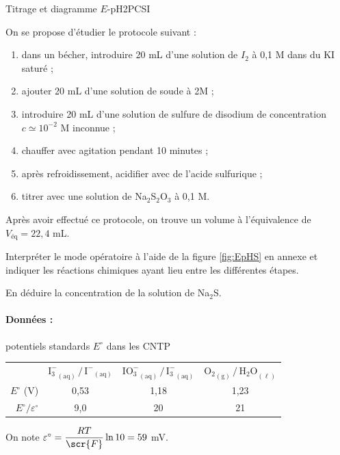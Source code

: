 \begin{exercise}{Titrage et diagramme $E$-pH}{2}{PCSI}
\begin{questions}
\begin{EnvUplevel}
On se propose d'étudier le protocole suivant :
\begin{enumerate}%
    \item dans un bécher, introduire 20 mL d'une solution de $I_2$ à 0,1 M dans du KI saturé ;
    \item ajouter 20 mL d'une solution de soude à 2M ;
    \item introduire 20 mL d'une solution de sulfure de disodium de concentration $c \simeq 10^{-2}$ M inconnue ;
    \item chauffer avec agitation pendant 10 minutes ;
    \item après refroidissement, acidifier avec de l'acide sulfurique ;
    \item titrer avec une solution de Na$_2$S$_2$O$_3$ à 0,1 M.
\end{enumerate}

Après avoir effectué ce protocole, on trouve un volume à l'équivalence de $V_\text{éq} = 22,4$ mL.
\end{EnvUplevel}

    \question Interpréter le mode opératoire à l'aide de la figure \ref{fig:EpHS} en annexe et indiquer les réactions chimiques ayant lieu entre les différentes étapes.
    
    \question En déduire la concentration de la solution de Na$_2$S.

\end{questions}

\paragraph{Données : } potentiels standards $E^\circ$ dans les CNTP
\begin{center}\begin{tabularx}{.7\linewidth}{rCCC}
    \hline
    & $\mathrm{{I_3^-}_{(aq)} \,/\, {I^-}_{(aq)}}$
    & $\mathrm{{IO_3^-}_{(aq)} \,/\, {I_3^-}_{(aq)}}$
    & $\mathrm{{O_2}_{(g)} \,/\, {H_2O}_{(\ell)}}$ \\
    $E^\circ$ (V) & 0,53 & 1,18 & 1,23 \\
    $E^\circ / \varepsilon^\circ$ & 9,0 & 20 & 21 \\ \hline\hline 
\end{tabularx}
\end{center}

On note $\varepsilon^\circ = \dfrac{RT}{\scr{F}} \ln10 = 59$ mV.


\end{exercise}

